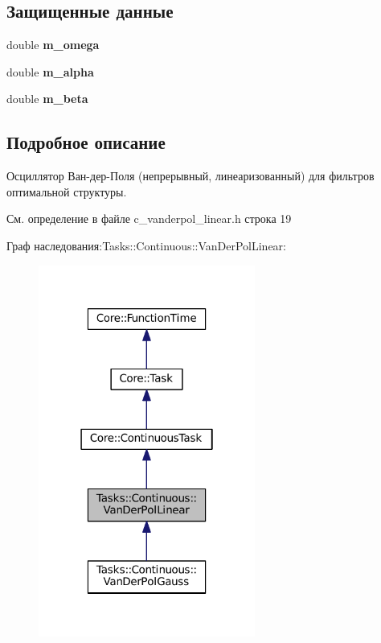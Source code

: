 \subsection*{Защищенные данные}
\begin{DoxyCompactItemize}
\item 
\hypertarget{class_tasks_1_1_continuous_1_1_van_der_pol_linear_a32bc8a8ea2d48bbee7cb368511d19bc5}{}\label{class_tasks_1_1_continuous_1_1_van_der_pol_linear_a32bc8a8ea2d48bbee7cb368511d19bc5} 
double {\bfseries m\+\_\+omega}
\item 
\hypertarget{class_tasks_1_1_continuous_1_1_van_der_pol_linear_a1054e1ea7e2459ac378fddb763077226}{}\label{class_tasks_1_1_continuous_1_1_van_der_pol_linear_a1054e1ea7e2459ac378fddb763077226} 
double {\bfseries m\+\_\+alpha}
\item 
\hypertarget{class_tasks_1_1_continuous_1_1_van_der_pol_linear_adf8894890b4e4a7d05c450ce145d69b9}{}\label{class_tasks_1_1_continuous_1_1_van_der_pol_linear_adf8894890b4e4a7d05c450ce145d69b9} 
double {\bfseries m\+\_\+beta}
\end{DoxyCompactItemize}


\subsection{Подробное описание}
Осциллятор Ван-\/дер-\/Поля (непрерывный, линеаризованный) для фильтров оптимальной структуры. 

См. определение в файле c\+\_\+vanderpol\+\_\+linear.\+h строка 19



Граф наследования\+:Tasks\+:\+:Continuous\+:\+:Van\+Der\+Pol\+Linear\+:\nopagebreak
\begin{figure}[H]
\begin{center}
\leavevmode
\includegraphics[width=202pt]{class_tasks_1_1_continuous_1_1_van_der_pol_linear__inherit__graph}
\end{center}
\end{figure}


